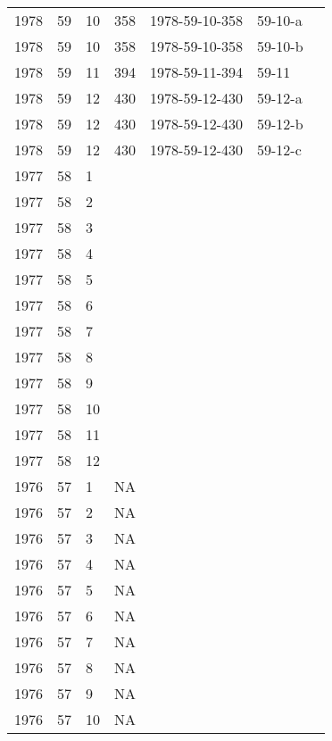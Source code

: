 \begin{longtable}{ |l|l|l|l|p{2.7cm}|l|p{2cm}| }
 1978 & 59 &    10 &     358 & 1978-59-10-358 & 59-10-a & \\
 1978 & 59 &    10 &     358 & 1978-59-10-358 & 59-10-b & \\
 1978 & 59 &    11 &     394 & 1978-59-11-394 & 59-11 & \\
 1978 & 59 &    12 &     430 & 1978-59-12-430 & 59-12-a & \\
 1978 & 59 &    12 &     430 & 1978-59-12-430 & 59-12-b & \\
 1978 & 59 &    12 &     430 & 1978-59-12-430 & 59-12-c & \\
 1977 & 58 &     1 &         &                &  &  \\
 1977 & 58 &     2 &         &                &  & \\
 1977 & 58 &     3 &         &                &  & \\
 1977 & 58 &     4 &         &                &  & \\
 1977 & 58 &     5 &         &                &  & \\
 1977 & 58 &     6 &         &                &  & \\
 1977 & 58 &     7 &         &                &  & \\
 1977 & 58 &     8 &         &                &  & \\
 1977 & 58 &     9 &         &                &  & \\
 1977 & 58 &    10 &         &                &  & \\
 1977 & 58 &    11 &         &                &  & \\
 1977 & 58 &    12 &         &                &  & \\
 1976 & 57 &     1 &    NA   &                &  & \\
 1976 & 57 &     2 &    NA   &                &  & \\
 1976 & 57 &     3 &    NA   &                &  & \\
 1976 & 57 &     4 &   NA    &                &  & \\
 1976 & 57 &     5 &   NA    &                &  & \\
 1976 & 57 &     6 &   NA    &                &  & \\
 1976 & 57 &     7 &     NA  &                &  & \\
 1976 & 57 &     8 &     NA  &                &  & \\
 1976 & 57 &     9 &     NA  &                &  & \\
 1976 & 57 &    10 &     NA  &                &  & \\

\end{longtable}

